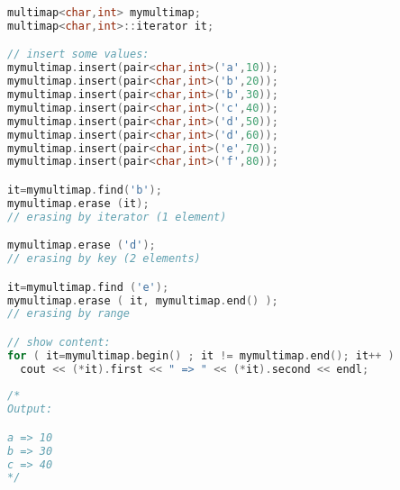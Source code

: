 	\begin{lstlisting}[language=c++]
multimap<char,int> mymultimap;
multimap<char,int>::iterator it;

// insert some values:
mymultimap.insert(pair<char,int>('a',10));
mymultimap.insert(pair<char,int>('b',20));
mymultimap.insert(pair<char,int>('b',30));
mymultimap.insert(pair<char,int>('c',40));
mymultimap.insert(pair<char,int>('d',50));
mymultimap.insert(pair<char,int>('d',60));
mymultimap.insert(pair<char,int>('e',70));
mymultimap.insert(pair<char,int>('f',80));

it=mymultimap.find('b');
mymultimap.erase (it);                     
// erasing by iterator (1 element)

mymultimap.erase ('d');                    
// erasing by key (2 elements)

it=mymultimap.find ('e');
mymultimap.erase ( it, mymultimap.end() ); 
// erasing by range

// show content:
for ( it=mymultimap.begin() ; it != mymultimap.end(); it++ )
  cout << (*it).first << " => " << (*it).second << endl;
    
/*
Output:

a => 10
b => 30
c => 40
*/
	\end{lstlisting}